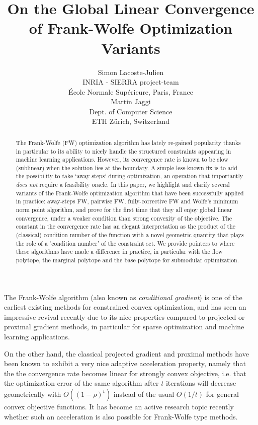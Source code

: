 \documentclass{article} %
\title{On the Global Linear Convergence \\ of Frank-Wolfe Optimization Variants}
\author{
Simon Lacoste-Julien \\
INRIA - SIERRA project-team\\
{\'E}cole Normale Sup{\'e}rieure, Paris, France \\
\And
Martin Jaggi \\
Dept. of Computer Science \\
ETH Z{\"u}rich, Switzerland \\
}
\newcommand{\0}{\mathbf{0}} %
\begin{document}
\maketitle
\vspace{-2mm}

\begin{abstract}\vspace{-2mm}
The Frank-Wolfe (FW) optimization algorithm has lately re-gained popularity
thanks in particular to its ability to nicely handle the structured
constraints appearing in machine learning applications. However, its
convergence rate is known to be slow (sublinear) when the solution lies at
the boundary. A simple less-known fix is to add the possibility to take `away
steps' during optimization, an operation that importantly \emph{does not}
require a feasibility oracle. %
%
In this paper, we highlight and clarify several variants of the Frank-Wolfe
optimization algorithm that have been successfully applied in practice: 
away-steps FW, pairwise FW, fully-corrective FW and Wolfe's minimum norm
point algorithm, and prove for the first time that they all enjoy global
linear convergence, under a weaker condition than strong convexity of the objective.
The constant in the convergence rate has an elegant interpretation as the product
of the (classical) condition number of the function with a novel geometric
quantity that plays the role of a `condition number' of the constraint set. 
We provide pointers to where these algorithms have made a difference in
practice, in particular with the flow polytope, the
marginal polytope and the base polytope for submodular optimization.

%
%
%
%
%
%
%
\end{abstract}

%

The Frank-Wolfe algorithm \citep{Frank:1956vp} (also known as
\emph{conditional gradient}) is one of the earliest existing methods for
constrained convex optimization, and has seen an impressive revival recently
due to its nice properties compared to projected or proximal gradient
methods, in particular for sparse optimization and machine learning
applications.

On the other hand, the classical projected gradient and proximal methods have
been known to exhibit a very nice adaptive acceleration property, 
namely that the the convergence rate becomes linear for strongly convex
objective, i.e. that the optimization error of the same algorithm after $t$
iterations will decrease geometrically with $O((1-\rho)^{t})$ instead of the
usual $O(1/t)$ for general convex objective functions.
It has become an active research topic recently whether such an acceleration
is also possible for Frank-Wolfe type methods.
%
%
%
\end{document}
